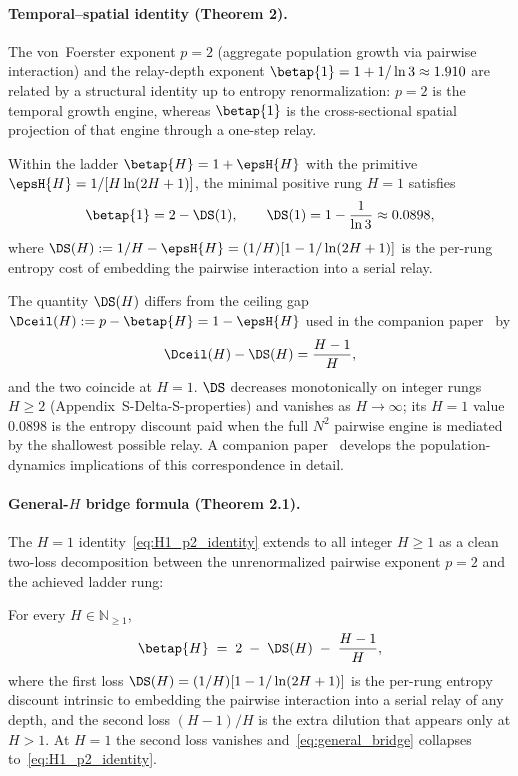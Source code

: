 \paragraph{Temporal--spatial identity (Theorem 2).}
The von~Foerster exponent $p=2$ (aggregate population growth via pairwise
interaction) and the relay-depth exponent $\betap{1}=1+1/\ln 3 \approx 1.910$
are related by a structural identity up to entropy renormalization:
$p=2$ is the temporal growth engine, whereas $\betap{1}$ is the
cross-sectional spatial projection of that engine through a one-step relay.

\begin{theorem}
Within the ladder $\betap{H}=1+\epsH{H}$ with the primitive
$\epsH{H}=1/[H\ln(2H+1)]$, the minimal positive rung $H=1$ satisfies
\begin{equation}
\betap{1}=2-\DS(1),\qquad \DS(1)=1-\frac{1}{\ln 3}\approx 0.0898,
\label{eq:H1_p2_identity}
\end{equation}
where $\DS(H):= 1/H-\epsH{H}=(1/H)[1-1/\ln(2H+1)]$ is the per-rung
entropy cost of embedding the pairwise interaction into a serial relay.
\end{theorem}

The quantity $\DS(H)$ differs from the ceiling gap $\Dceil(H):=
p-\betap{H}=1-\epsH{H}$ used in the companion paper~\cite{Kato2026c} by
\begin{equation}
\Dceil(H)-\DS(H)=\frac{H-1}{H},
\label{eq:Dceil_DS_identity}
\end{equation}
and the two coincide at $H=1$.  $\DS$ decreases monotonically on integer
rungs $H\ge 2$ (Appendix~\textsf{S-Delta-S-properties}) and vanishes as
$H\to\infty$; its $H=1$ value $0.0898$ is the entropy discount paid when
the full $N^{2}$ pairwise engine is mediated by the shallowest possible
relay.  A companion paper~\cite{Kato2026c} develops the population-dynamics
implications of this correspondence in detail.

\paragraph{General-$H$ bridge formula (Theorem 2.1).}
The $H=1$ identity~\eqref{eq:H1_p2_identity} extends to all integer $H\ge 1$
as a clean two-loss decomposition between the unrenormalized pairwise
exponent $p=2$ and the achieved ladder rung:

\begin{theorem}
For every $H\in\mathbb{N}_{\ge 1}$,
\begin{equation}
\betap{H}\;=\;2\;-\;\DS(H)\;-\;\frac{H-1}{H},
\label{eq:general_bridge}
\end{equation}
where the first loss $\DS(H)=(1/H)[1-1/\ln(2H+1)]$ is the per-rung entropy
discount intrinsic to embedding the pairwise interaction into a serial relay
of any depth, and the second loss $(H-1)/H$ is the extra dilution that
appears only at $H>1$.  At $H=1$ the second loss vanishes and~\eqref{eq:general_bridge}
collapses to~\eqref{eq:H1_p2_identity}.
\end{theorem}

